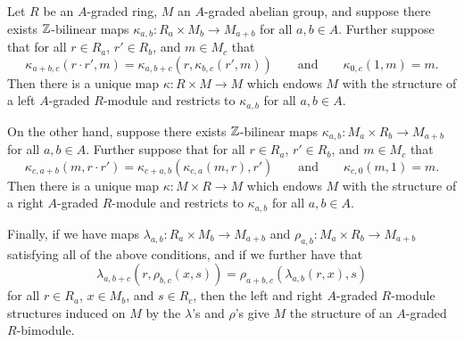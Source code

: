 \documentclass[../main.tex]{subfiles}
\begin{document}
\begin{lemma}\label{A-graded_module}
	Let $R$ be an $A$-graded ring, $M$ an $A$-graded abelian group, and suppose there exists $\mathbb{Z}$-bilinear maps $\kappa_{a,b}:R_a\times M_b\to M_{a+b}$ for all $a,b\in A$. Further suppose that for all $r\in R_a$, $r'\in R_b$, and $m\in M_c$ that
	\[\kappa_{a+b,c}(r\cdot r',m)=\kappa_{a,b+c}(r,\kappa_{b,c}(r',m))\qquad\text{and}\qquad\kappa_{0,c}(1,m)=m.\]
	Then there is a unique map $\kappa:R\times M\to M$ which endows $M$ with the structure of a left $A$-graded $R$-module and restricts to $\kappa_{a,b}$ for all $a,b\in A$.

	On the other hand, suppose there exists $\mathbb{Z}$-bilinear maps $\kappa_{a,b}:M_a\times R_b\to M_{a+b}$ for all $a,b\in A$. Further suppose that for all $r\in R_a$, $r'\in R_b$, and $m\in M_c$ that
	\[\kappa_{c,a+b}(m,r\cdot r')=\kappa_{c+a,b}(\kappa_{c,a}(m,r),r')\qquad\text{and}\qquad\kappa_{c,0}(m,1)=m.\]
	Then there is a unique map $\kappa:M\times R\to M$ which endows $M$ with the structure of a right $A$-graded $R$-module and restricts to $\kappa_{a,b}$ for all $a,b\in A$.

	Finally, if we have maps $\lambda_{a,b}:R_a\times M_b\to M_{a+b}$ and $\rho_{a,b}:M_a\times R_b\to M_{a+b}$ satisfying all of the above conditions, and if we further have that
	\[\lambda_{a,b+c}(r,\rho_{b,c}(x,s))=\rho_{a+b,c}(\lambda_{a,b}(r,x),s)\]
	for all $r\in R_a$, $x\in M_b$, and $s\in R_c$, then the left and right $A$-graded $R$-module structures induced on $M$ by the $\lambda$'s and $\rho$'s give $M$ the structure of an $A$-graded $R$-bimodule.
\end{lemma}
\end{document}
